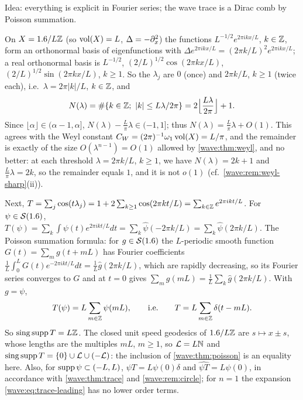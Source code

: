 \subsection*{}
Idea: everything is explicit in Fourier series; the wave trace is a Dirac comb by Poisson summation.

On $X=1.6/L\mathbb{Z}$ (so $\operatorname{vol}(X)=L$, $\Delta=-\partial_x^2$) the functions $L^{-1/2}e^{2\pi ikx/L}$, $k\in\mathbb{Z}$, form
an orthonormal basis of eigenfunctions with $\Delta e^{2\pi ikx/L}=(2\pi k/L)^2e^{2\pi ikx/L}$; a real
orthonormal basis is $L^{-1/2}$, $(2/L)^{1/2}\cos(2\pi kx/L)$, $(2/L)^{1/2}\sin(2\pi kx/L)$, $k\ge1$.
So the $\lambda_j$ are $0$ (once) and $2\pi k/L$, $k\ge1$ (twice each), i.e.\ $\lambda=2\pi|k|/L$, $k\in\mathbb{Z}$,
and
\begin{equation*}
  N(\lambda)=\#\{k\in\mathbb{Z};\ |k|\le L\lambda/2\pi\}=2\Big\lfloor\frac{L\lambda}{2\pi}\Big\rfloor+1 .
\end{equation*}
Since $\lfloor\alpha\rfloor\in(\alpha-1,\alpha]$, $N(\lambda)-\frac L\pi\lambda\in(-1,1]$; thus
$N(\lambda)=\frac L\pi\lambda+O(1)$. This agrees with the Weyl constant $C_W=(2\pi)^{-1}\omega_1\operatorname{vol}(X)=L/\pi$,
and the remainder is exactly of the size $O(\lambda^{n-1})=O(1)$ allowed by
\cref{wave:thm:weyl}, and no better: at each threshold $\lambda=2\pi k/L$, $k\ge1$, we have
$N(\lambda)=2k+1$ and $\frac L\pi\lambda=2k$, so the remainder equals $1$, and it is not
$o(1)$ (cf.\ \cref{wave:rem:weyl-sharp}(ii)).

Next, $T=\sum_j\cos(t\lambda_j)=1+2\sum_{k\ge1}\cos(2\pi kt/L)=\sum_{k\in\mathbb{Z}}e^{2\pi ikt/L}$. For
$\psi\in\mathcal{S}(1.6)$, $T(\psi)=\sum_k\int\psi(t)e^{2\pi ikt/L}dt=\sum_k\hat\psi(-2\pi k/L)=\sum_k\hat\psi(2\pi k/L)$.
The Poisson summation formula: for $g\in\mathcal{S}(1.6)$ the $L$-periodic smooth function
$G(t)=\sum_mg(t+mL)$ has Fourier coefficients $\frac1L\int_0^LG(t)e^{-2\pi ikt/L}dt=\frac1L\hat g(2\pi k/L)$,
which are rapidly decreasing, so its Fourier series converges to $G$ and at $t=0$ gives
$\sum_mg(mL)=\frac1L\sum_k\hat g(2\pi k/L)$. With $g=\psi$,
\begin{equation*}
  T(\psi)=L\sum_{m\in\mathbb{Z}}\psi(mL),\qquad\text{i.e.}\qquad T=L\sum_{m\in\mathbb{Z}}\delta(t-mL).
\end{equation*}
So $\operatorname{sing\,supp} T=L\mathbb{Z}$. The closed unit speed geodesics of $1.6/L\mathbb{Z}$ are $s\mapsto x\pm s$, whose
lengths are the multiples $mL$, $m\ge1$, so $\mathcal{L}=L\mathbb{N}$ and $\operatorname{sing\,supp} T=\{0\}\cup\mathcal{L}\cup(-\mathcal{L})$:
the inclusion of \cref{wave:thm:poisson} is an equality here. Also, for $\operatorname{supp}\psi\subset(-L,L)$,
$\psi T=L\psi(0)\delta$ and $\widehat{\psi T}=L\psi(0)$, in accordance with \cref{wave:thm:trace} and
\cref{wave:rem:circle}; for $n=1$ the expansion \eqref{wave:eq:trace-leading} has no lower order terms.

